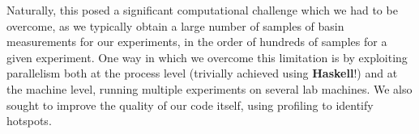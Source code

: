 Naturally, this posed a significant computational challenge which we had to be overcome, as we typically obtain a large number of samples of basin measurements for our experiments, in the order of hundreds of samples for a given experiment. One way in which we overcome this limitation is by exploiting parallelism both at the process level (trivially achieved using \textbf{Haskell}!) and at the machine level, running multiple experiments on several lab machines. We also sought to improve the quality of our code itself, using profiling to identify hotspots. 